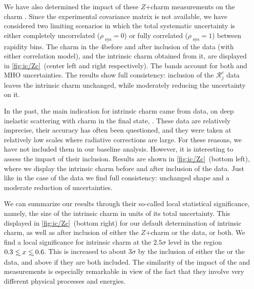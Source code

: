 We have also determined the impact of these \lhcb $Z$+charm measurements on the
charm \pdf.
%
Since the experimental covariance matrix is not available, we have considered
two limiting scenarios in which the total systematic uncertainty is either
completely uncorrelated  ($\rho_\textrm{ sys}=0$) or fully correlated 
($\rho_\textrm{ sys}=1$) between rapidity bins.
The charm \pdf in the 4\fns before and after inclusion of the \lhcb data (with
either correlation model), and the intrinsic charm \pdf obtained from it, are
displayed in \cref{fig:ic/Zc}~(center left and right respectively).
%
The bands account for both \pdf and MHO uncertainties.
%
The results show full consistency: inclusion of the \lhcb  $\mathcal{R}_j^c$
data leaves the intrinsic charm \pdf unchanged, while moderately reducing the
uncertainty on it.

In the past, the main indication for  intrinsic charm came from \emc data,
\cite{Aubert:1982tt} on deep inelastic scattering with charm in the final
state, \cite{Harris:1995jx}.
%
These data are relatively imprecise, their accuracy has often been questioned,
and they were taken at relatively low scales where radiative corrections are
large.
%
For these reasons, we have not included them in our baseline analysis.
%
However, it is interesting to assess the impact of their inclusion.
%
Results are shown in \cref{fig:ic/Zc}~(bottom left), where we display the
intrinsic charm \pdf before and after inclusion of the \emc data.
%
Just like in the case of the \lhcb data we find full consistency: unchanged
shape and a moderate reduction of uncertainties.

We can summarize our results  through their so-called local statistical
significance, namely, the size of the intrinsic charm \pdf in units of its
total uncertainty.
%
This displayed in \cref{fig:ic/Zc}~(bottom right) for our default determination
of intrinsic charm, as well as after inclusion of either the \lhcb $Z$+charm or
the \emc data, or both.
%
We find a local significance for intrinsic charm at the $2.5\sigma$ level in
the region $0.3 \lsim x \lsim 0.6$.
%
This is increased to about $3\sigma$ by the inclusion of either the \emc or the
\lhcb data, and above if they are both included.
%
The similarity of the impact of the \emc and \lhcb measurements is especially
remarkable in view of the fact that they involve very different physical
processes and energies.
